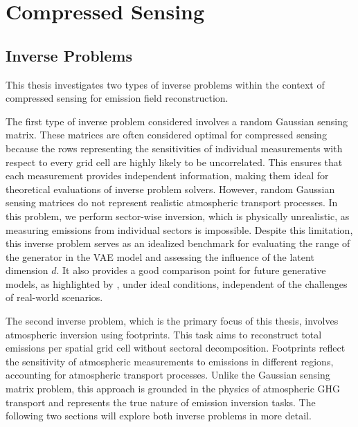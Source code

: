
\chapter{Compressed Sensing}

\section{Inverse Problems} 
This thesis investigates two types of inverse problems within the context of compressed sensing for emission field reconstruction.

The first type of inverse problem considered involves a random Gaussian sensing matrix.
These matrices are often considered optimal for compressed sensing because the rows representing the sensitivities of individual measurements with respect to every grid cell are highly likely to be uncorrelated.
This ensures that each measurement provides independent information, making them ideal for theoretical evaluations of inverse problem solvers.
However, random Gaussian sensing matrices do not represent realistic atmospheric transport processes.
In this problem, we perform sector-wise inversion, which is physically unrealistic, as measuring emissions from individual sectors is impossible.
Despite this limitation, this inverse problem serves as an idealized benchmark for evaluating the range of the generator in the \gls{VAE} model and assessing the influence of the latent dimension $d$.
It also provides a good comparison point for future generative models, as highlighted by \textcite{CSUsingAI}, under ideal conditions, independent of the challenges of real-world scenarios.

The second inverse problem, which is the primary focus of this thesis, involves atmospheric inversion using footprints.
This task aims to reconstruct total emissions per spatial grid cell without sectoral decomposition.
Footprints reflect the sensitivity of atmospheric measurements to emissions in different regions, accounting for atmospheric transport processes.
Unlike the Gaussian sensing matrix problem, this approach is grounded in the physics of atmospheric \gls{GHG} transport and represents the true nature of emission inversion tasks.
The following two sections will explore both inverse problems in more detail.

